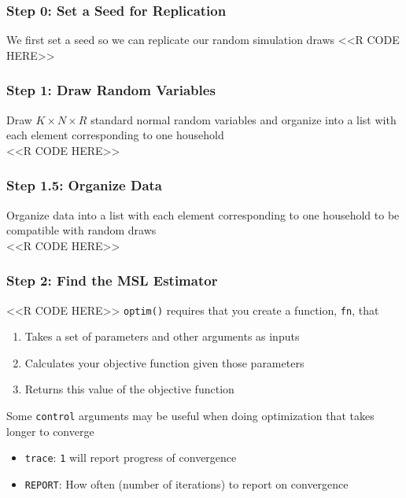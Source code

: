 \documentclass{beamer}
\begin{document}
\begin{frame}[fragile]\frametitle{Step 0: Set a Seed for Replication}
	We first set a seed so we can replicate our random simulation draws 
    \vspace{1ex}
    <<R CODE HERE>>
\end{frame}

\begin{frame}[fragile]\frametitle{Step 1: Draw Random Variables}
	Draw $K \times N \times R$ standard normal random variables and organize into a list with each element corresponding to one household \\
    \vspace{1ex}
    <<R CODE HERE>>
\end{frame}

\begin{frame}[fragile]\frametitle{Step 1.5: Organize Data}
    Organize data into a list with each element corresponding to one household to be compatible with random draws \\
    \vspace{1ex}
    <<R CODE HERE>>
\end{frame}

\begin{frame}[fragile]\frametitle{Step 2: Find the MSL Estimator}
    <<R CODE HERE>>
    \vspace{2ex}
	\texttt{optim()} requires that you create a function, \texttt{fn}, that
	\begin{enumerate}
		\item Takes a set of parameters and other arguments as inputs
		\item Calculates your objective function given those parameters
		\item Returns this value of the objective function
	\end{enumerate}
	\vspace{2ex}
	Some \texttt{control} arguments may be useful when doing optimization that takes longer to converge
	\begin{itemize}
		\item \texttt{trace}: \texttt{1} will report progress of convergence
		\item \texttt{REPORT}: How often (number of iterations) to report on convergence
	\end{itemize}
\end{frame}
\end{document}
